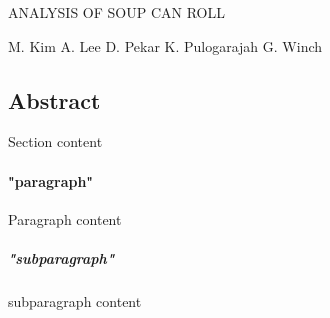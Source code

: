 \documentclass[12pt,notitlepage,twoside,draft]{article}
\begin{document}
  

\centering
\huge
\uppercase{Analysis of Soup Can Roll}
{\large\centering
\newline
M. Kim
\newline
A. Lee
\newline
D. Pekar
\newline
K. Pulogarajah
\newline
G. Winch\par}

\begin{multicols}{2}
\section{Abstract}
Section content


\paragraph{"paragraph"}
Paragraph content
\subparagraph{"subparagraph"}
subparagraph content
\end{multicols}
\end{document}

